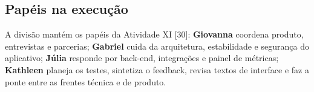 \subsection{Papéis na execução}

A divisão mantém os papéis da Atividade XI [30]: \textbf{Giovanna} coordena produto, entrevistas e parcerias; \textbf{Gabriel} cuida da arquitetura, estabilidade e segurança do aplicativo; \textbf{Júlia} responde por back-end, integrações e painel de métricas; \textbf{Kathleen} planeja os testes, sintetiza o feedback, revisa textos de interface e faz a ponte entre as frentes técnica e de produto.
